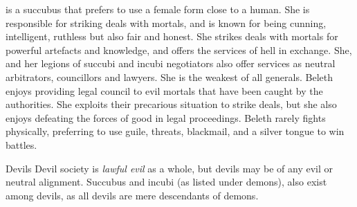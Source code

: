  is a succubus that prefers to use a female form
close to a human. She is responsible for striking deals with mortals, and is
known for being cunning, intelligent, ruthless but also fair and honest. She
strikes deals with mortals for powerful artefacts and knowledge, and offers
the services of hell in exchange. She, and her legions of succubi and incubi
negotiators also offer services as neutral arbitrators, councillors and
lawyers. She is the weakest of all generals. Beleth enjoys providing legal
council to evil mortals that have been caught by the authorities. She exploits
their precarious situation to strike deals, but she also enjoys defeating
the forces of good in legal proceedings. Beleth rarely fights physically,
preferring to use guile, threats, blackmail, and a silver tongue to win
battles.

\begin{35e}{Devils}
  Devil society is \emph{lawful evil} as a whole, but devils may be of any
  evil or neutral alignment. Succubus and incubi (as listed under demons),
  also exist among devils, as all devils are mere descendants of demons.
\end{35e}
